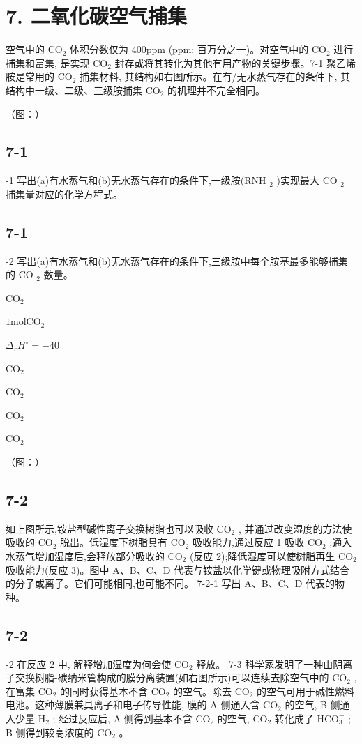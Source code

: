 \section*{7. 二氧化碳空气捕集}
空气中的 $\mathrm{CO}_{2}$ 体积分数仅为 $400 \mathrm{ppm}$ (ppm: 百万分之一)。对空气中的 $\mathrm{CO}_{2}$ 进行捕集和富集, 是实现 $\mathrm{CO}_{2}$ 封存或将其转化为其他有用产物的关键步骤。7-1 聚乙烯胺是常用的 $\mathrm{CO}_{2}$ 捕集材料, 其结构如右图所示。在有/无水蒸气存在的条件下, 其结构中一级、二级、三级胺捕集 $\mathrm{CO}_{2}$ 的机理并不完全相同。

（图：）

\subsection*{7-1}
-1 写出(a)有水蒸气和(b)无水蒸气存在的条件下,一级胺(RNH $_{2}$ )实现最大 CO $_{2}$ 捕集量对应的化学方程式。

\subsection*{7-1}
-2 写出(a)有水蒸气和(b)无水蒸气存在的条件下,三级胺中每个胺基最多能够捕集的 CO $_{2}$ 数量。

$
\mathrm{CO} _ {2}
$

$
1 \mathrm{mol} \mathrm{CO} _ {2}
$

$
\Delta_ {r} H ^ {\circ} = - 4 0
$

$
\mathrm{CO} _ {2}
$

$
\mathrm{CO} _ {2}
$

$
\mathrm{CO} _ {2}
$

$
\mathrm{CO} _ {2}
$

（图：）

\subsection*{7-2}
如上图所示,铵盐型碱性离子交换树脂也可以吸收 $\mathrm{CO}_{2}$ , 并通过改变湿度的方法使吸收的 $\mathrm{CO}_{2}$ 脱出。低湿度下树脂具有 $\mathrm{CO}_{2}$ 吸收能力,通过反应 1 吸收 $\mathrm{CO}_{2}$ ;通入水蒸气增加湿度后,会释放部分吸收的 $\mathrm{CO}_{2}$ (反应 2);降低湿度可以使树脂再生 $\mathrm{CO}_{2}$ 吸收能力(反应 3)。图中 A、B、C、D 代表与铵盐以化学键或物理吸附方式结合的分子或离子。它们可能相同,也可能不同。 7-2-1 写出 A、B、C、D 代表的物种。

\subsection*{7-2}
-2 在反应 2 中, 解释增加湿度为何会使 $\mathrm{CO}_{2}$ 释放。 7-3 科学家发明了一种由阴离子交换树脂-碳纳米管构成的膜分离装置(如右图所示)可以连续去除空气中的 $\mathrm{CO}_{2}$ , 在富集 $\mathrm{CO}_{2}$ 的同时获得基本不含 $\mathrm{CO}_{2}$ 的空气。除去 $\mathrm{CO}_{2}$ 的空气可用于碱性燃料电池。这种薄膜兼具离子和电子传导性能, 膜的 A 侧通入含 $\mathrm{CO}_{2}$ 的空气, B 侧通入少量 $\mathrm{H}_{2}$ ; 经过反应后, A 侧得到基本不含 $\mathrm{CO}_{2}$ 的空气, $\mathrm{CO}_{2}$ 转化成了 $\mathrm{HCO}_{3}^{-}$ ; B 侧得到较高浓度的 $\mathrm{CO}_{2}$ 。

